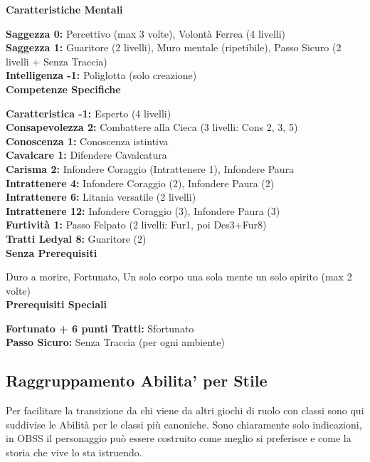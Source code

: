 \begin{multicols}{2}
	\textbf{Caratteristiche Mentali}

	\textbf{Saggezza 0:} Percettivo (max 3 volte), Volontà Ferrea (4 livelli)\\
	\textbf{Saggezza 1:} Guaritore (2 livelli), Muro mentale (ripetibile), Passo Sicuro (2 livelli + Senza Traccia)\\
	\textbf{Intelligenza -1:} Poliglotta (solo creazione)\\

	\textbf{Competenze Specifiche}

	\textbf{Caratteristica -1:} Esperto (4 livelli)\\
	\textbf{Consapevolezza 2:} Combattere alla Cieca (3 livelli: Cons 2, 3, 5)\\
	\textbf{Conoscenza 1:} Conoscenza istintiva\\
	\textbf{Cavalcare 1:} Difendere Cavalcatura\\
	\textbf{Carisma 2:} Infondere Coraggio (Intrattenere 1), Infondere Paura\\
	\textbf{Intrattenere 4:} Infondere Coraggio (2), Infondere Paura (2)\\
	\textbf{Intrattenere 6:} Litania versatile (2 livelli)\\
	\textbf{Intrattenere 12:} Infondere Coraggio (3), Infondere Paura (3)\\
	\textbf{Furtività 1:} Passo Felpato (2 livelli: Fur1, poi Des3+Fur8)\\
	\textbf{Tratti Ledyal 8:} Guaritore (2)\\

	\textbf{Senza Prerequisiti}

	Duro a morire, Fortunato, Un solo corpo una sola mente un solo spirito (max 2 volte)\\

	\textbf{Prerequisiti Speciali}

	\textbf{Fortunato + 6 punti Tratti:} Sfortunato\\
	\textbf{Passo Sicuro:} Senza Traccia (per ogni ambiente)\\


\end{multicols}

\pagebreak

\subsection{Raggruppamento Abilita' per Stile}

Per facilitare la transizione da chi viene da altri giochi di ruolo con classi sono qui suddivise le Abilità per le classi più canoniche. Sono chiaramente solo indicazioni, in OBSS il personaggio può essere costruito come meglio si preferisce e come la storia che vive lo sta istruendo.

